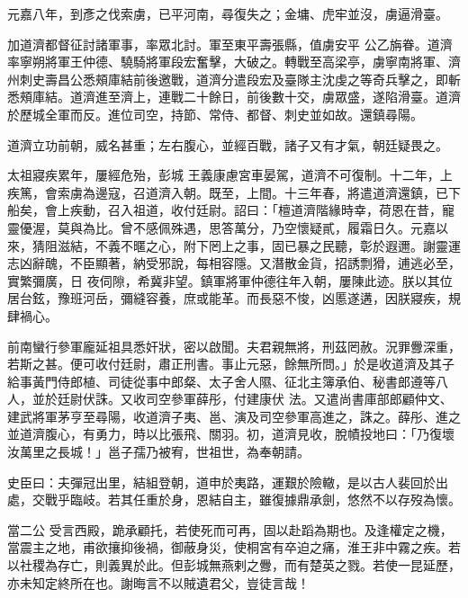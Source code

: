 \begin{pinyinscope}
 元嘉八年，到彥之伐索虜，已平河南，尋復失之；金墉、虎牢並沒，虜逼滑臺。



 加道濟都督征討諸軍事，率眾北討。軍至東平壽張縣，值虜安平
 公乙旃眷。道濟率寧朔將軍王仲德、驍騎將軍段宏奮擊，大破之。轉戰至高梁亭，虜寧南將軍、濟州刺史壽昌公悉頰庫結前後邀戰，道濟分遣段宏及臺隊主沈虔之等奇兵擊之，即斬悉頰庫結。道濟進至濟上，連戰二十餘日，前後數十交，虜眾盛，遂陷滑臺。道濟於歷城全軍而反。進位司空，持節、常侍、都督、刺史並如故。還鎮尋陽。



 道濟立功前朝，威名甚重；左右腹心，並經百戰，諸子又有才氣，朝廷疑畏之。



 太祖寢疾累年，屢經危殆，彭城
 王義康慮宮車晏駕，道濟不可復制。十二年，上疾篤，會索虜為邊寇，召道濟入朝。既至，上間。十三年春，將遣道濟還鎮，已下船矣，會上疾動，召入祖道，收付廷尉。詔曰：「檀道濟階緣時幸，荷恩在昔，寵靈優渥，莫與為比。曾不感佩殊遇，思答萬分，乃空懷疑貳，履霜日久。元嘉以來，猜阻滋結，不義不暱之心，附下罔上之事，固已暴之民聽，彰於遐邇。謝靈運志凶辭醜，不臣顯著，納受邪說，每相容隱。又潛散金貨，招誘剽猾，逋逃必至，實繁彌廣，日
 夜伺隙，希冀非望。鎮軍將軍仲德往年入朝，屢陳此迹。朕以其位居台鉉，豫班河岳，彌縫容養，庶或能革。而長惡不悛，凶慝遂遘，因朕寢疾，規肆禍心。



 前南蠻行參軍龐延祖具悉奸狀，密以啟聞。夫君親無將，刑茲罔赦。況罪釁深重，若斯之甚。便可收付廷尉，肅正刑書。事止元惡，餘無所問。」於是收道濟及其子給事黃門侍郎植、司徒從事中郎粲、太子舍人隰、征北主簿承伯、秘書郎遵等八人，並於廷尉伏誅。又收司空參軍薛彤，付建康伏
 法。又遣尚書庫部郎顧仲文、建武將軍茅亨至尋陽，收道濟子夷、邕、演及司空參軍高進之，誅之。薛彤、進之並道濟腹心，有勇力，時以比張飛、關羽。初，道濟見收，脫幘投地曰：「乃復壞汝萬里之長城！」邕子孺乃被宥，世祖世，為奉朝請。



 史臣曰：夫彈冠出里，結組登朝，道申於夷路，運艱於險轍，是以古人裴回於出處，交戰乎臨岐。若其任重於身，恩結自主，雖復據鼎承劍，悠然不以存歿為懷。



 當二公
 受言西殿，跪承顧托，若使死而可再，固以赴蹈為期也。及逢權定之機，當震主之地，甫欲攘抑後禍，御蔽身災，使桐宮有卒迫之痛，淮王非中霧之疾。若以社稷為存亡，則義異於此。但彭城無燕剌之釁，而有楚英之戮。若使一昆延歷，亦未知定終所在也。謝晦言不以賊遺君父，豈徒言哉！



\end{pinyinscope}